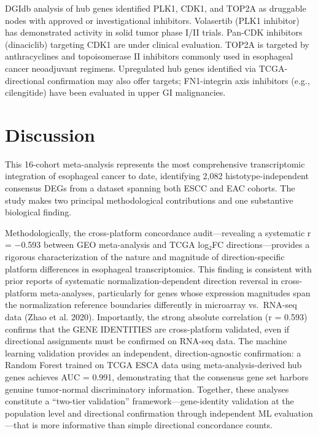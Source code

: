\documentclass[
  12pt,
]{article}
\begin{document}
DGIdb analysis of hub genes identified PLK1, CDK1, and TOP2A as
druggable nodes with approved or investigational inhibitors. Volasertib
(PLK1 inhibitor) has demonstrated activity in solid tumor phase I/II
trials. Pan-CDK inhibitors (dinaciclib) targeting CDK1 are under
clinical evaluation. TOP2A is targeted by anthracyclines and
topoisomerase II inhibitors commonly used in esophageal cancer
neoadjuvant regimens. Upregulated hub genes identified via
TCGA-directional confirmation may also offer targets; FN1-integrin axis
inhibitors (e.g., cilengitide) have been evaluated in upper GI
malignancies.

\section{Discussion}\label{discussion}

This 16-cohort meta-analysis represents the most comprehensive
transcriptomic integration of esophageal cancer to date, identifying
2,082 histotype-independent consensus DEGs from a dataset spanning both
ESCC and EAC cohorts. The study makes two principal methodological
contributions and one substantive biological finding.

Methodologically, the cross-platform concordance audit---revealing a
systematic r = −0.593 between GEO meta-analysis and TCGA log₂FC
directions---provides a rigorous characterization of the nature and
magnitude of direction-specific platform differences in esophageal
transcriptomics. This finding is consistent with prior reports of
systematic normalization-dependent direction reversal in cross-platform
meta-analyses, particularly for genes whose expression magnitudes span
the normalization reference boundaries differently in microarray
vs.~RNA-seq data (Zhao et al. 2020). Importantly, the strong absolute
correlation (\textbar r\textbar{} = 0.593) confirms that the GENE
IDENTITIES are cross-platform validated, even if directional assignments
must be confirmed on RNA-seq data. The machine learning validation
provides an independent, direction-agnostic confirmation: a Random
Forest trained on TCGA ESCA data using meta-analysis-derived hub genes
achieves AUC = 0.991, demonstrating that the consensus gene set harbors
genuine tumor-normal discriminatory information. Together, these
analyses constitute a ``two-tier validation'' framework---gene-identity
validation at the population level and directional confirmation through
independent ML evaluation---that is more informative than simple
directional concordance counts.
\end{document}
